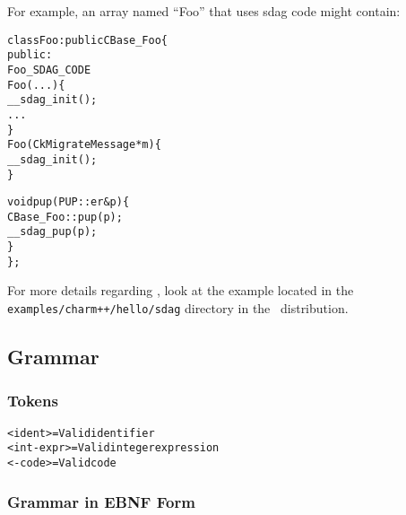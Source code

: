 For example, an array named ``Foo'' that uses sdag code might contain:

\begin{alltt}
class Foo : public CBase_Foo \{
    public:
    Foo_SDAG_CODE
    Foo(...) \{
        __sdag_init();
        ...
    \}
    Foo(CkMigrateMessage *m) \{
        __sdag_init();
    \}
    
    void pup(PUP::er &p) \{
        CBase_Foo::pup(p);
        __sdag_pup(p);
    \}
\};
\end{alltt}

For more details regarding \sdag{}, look at the example located in the 
{\tt examples/charm++/hello/sdag} directory in the \charmpp\ distribution.


\subsection{Grammar}

\subsubsection{Tokens}

\begin{alltt}
  <ident> = Valid \CC{} identifier 
  <int-expr> = Valid \CC{} integer expression 
  <\CC{}-code> = Valid \CC{} code 
\end{alltt}

\subsubsection{Grammar in EBNF Form}

